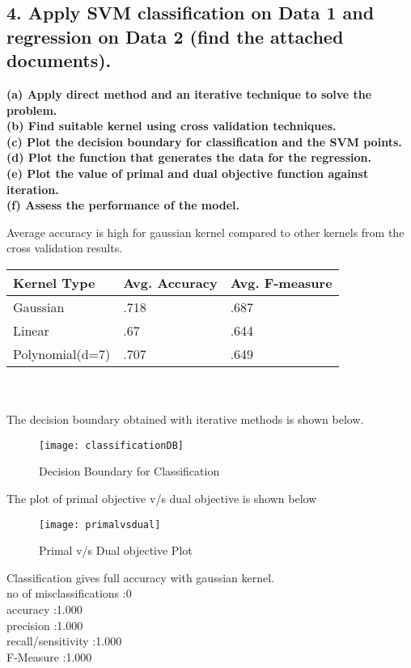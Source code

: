 \documentclass{article}
\begin{document}
\subsection{4. Apply SVM classification on Data 1 and regression on Data 2 (find the attached documents).}
\textbf{(a) Apply direct method and an iterative technique to solve the problem.\\ (b) Find suitable kernel using cross validation techniques.\\ (c) Plot the decision boundary for classification and the SVM points.\\ (d) Plot the function that generates the data for the regression.\\ (e) Plot the value of primal and dual objective function against iteration.\\ (f) Assess the performance of the model.}

Average accuracy is high for gaussian kernel compared to other kernels from the cross validation results. \\
\begin{tabular}{|l|l|l|}
	\hline
	\textbf{Kernel Type} & \textbf{Avg. Accuracy} & \textbf{Avg. F-measure}\\
	\hline	
	Gaussian & .718 & .687\\
  	Linear & .67 & .644\\
  	Polynomial(d=7)& .707 & .649\\
  	\hline
\end{tabular}\\ \\

The decision boundary obtained with iterative methods is shown below.
\begin{figure}[H]
  \centering
  \texttt{[image: classificationDB]}
  \caption{Decision Boundary for Classification}
\end{figure}
The plot of primal objective v/s dual objective is shown  below
\begin{figure}[H]
  \centering
  \texttt{[image: primalvsdual]}
  \caption{Primal v/s Dual objective Plot}
\end{figure}
Classification gives full accuracy with gaussian kernel.\\
no of misclassifications :0\\
accuracy :1.000\\
precision :1.000\\
recall/sensitivity :1.000\\
F-Measure :1.000\\
\end{document}
